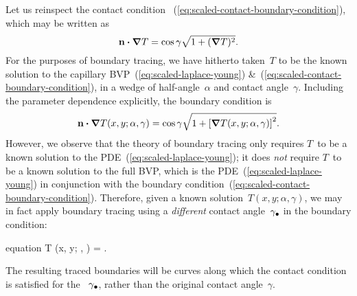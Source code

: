 Let us reinspect the contact condition~%
  (\ref{eq:scaled-contact-boundary-condition}),
which may be written as
\begin{equation}
  \mathop{}\!\boldsymbol{\mathbf{n}} \boldsymbol{\cdot} \mathop{}\!\boldsymbol{\mathbf{\nabla}} T = \cos\gamma \sqrt{1 + (\mathop{}\!\boldsymbol{\mathbf{\nabla}} T)^2}.
  \label{eq:moderate-flux-boundary-condition-reinspect}
\end{equation}
For the purposes of boundary tracing,
we have hitherto taken~$T$ to be the known solution
to the capillary BVP~(\ref{eq:scaled-laplace-young})
\&~(\ref{eq:scaled-contact-boundary-condition}),
in a wedge of half-angle~$\alpha$
and contact angle~$\gamma$.
Including the parameter dependence explicitly,
the boundary condition is
\begin{equation}
  \normalvec \dotp \del T (x, y; \alpha, \gamma) =
    \cos\gamma
    \sqrt{1 + \squarebr[\bulkysize]{\del T (x, y; \alpha, \gamma)}^2}.
  \label{eq:moderate-flux-boundary-condition-with-parameters}
\end{equation}
However, we observe that the theory of boundary tracing
only requires $T$~to be a known solution
to the PDE~(\ref{eq:scaled-laplace-young});
it does \emph{not} require $T$~to be a known solution to the full BVP\@,
which is the PDE~(\ref{eq:scaled-laplace-young}) in conjunction with
the boundary condition~(\ref{eq:scaled-contact-boundary-condition}).
Therefore,
given a known solution~$T (x, y; \alpha, \gamma)$,
we may in fact apply boundary tracing
using a \emph{different} contact angle~$\gamma_\bullet$
in the boundary condition:
\begin{important}{equation}
  \normalvec \dotp \del T (x, y; \alpha, \gamma) =
    \cos\tr{\gamma}
    .
  \label{eq:moderate-flux-boundary-condition-different-angle}
\end{important}
The resulting traced boundaries will be curves along which
the contact condition is satisfied
for the ~$\gamma_\bullet$,
rather than the original contact angle~$\gamma$.


